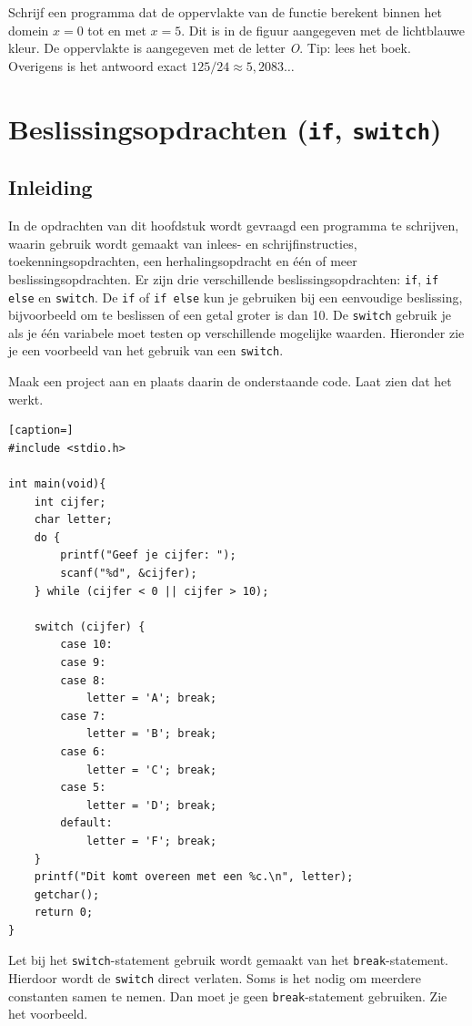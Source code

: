 \documentclass[a4paper,10pt,fleqn,twoside]{article}
\begin{document}
Schrijf een programma dat de oppervlakte van de functie berekent binnen het domein $x=0$ tot en met $x=5$. Dit is in de figuur aangegeven met de lichtblauwe kleur. De oppervlakte is aangegeven met de letter \textsl{O}. Tip: lees het boek. Overigens is het antwoord exact $125/24 \approx 5,2083\ldots$


\clearpage
\section{Beslissingsopdrachten (\texttt{if}, \texttt{switch})}

\subsection{Inleiding}
In de opdrachten van dit hoofdstuk wordt gevraagd een programma te schrijven, waarin gebruik wordt gemaakt van inlees- en schrijfinstructies, toekenningsopdrachten, een herhalingsopdracht en één of meer beslissingsopdrachten. Er zijn drie verschillende beslissingsopdrachten: \lstinline|if|, \lstinline|if else| en \lstinline|switch|. De \lstinline|if| of \lstinline|if else| kun je gebruiken bij een eenvoudige beslissing, bijvoorbeeld om te beslissen of een getal groter is dan 10. De \lstinline|switch| gebruik je als je één variabele moet testen op verschillende mogelijke waarden. Hieronder zie je een voorbeeld van het gebruik van een \lstinline|switch|.

Maak een project aan en plaats daarin de onderstaande code. Laat zien dat het werkt.

\begin{lstlisting}[caption=]
#include <stdio.h>

int main(void){
    int cijfer;
    char letter;
    do {
        printf("Geef je cijfer: ");
        scanf("%d", &cijfer);
    } while (cijfer < 0 || cijfer > 10);
    
    switch (cijfer) {
        case 10:
        case 9:
        case 8:
            letter = 'A'; break;
        case 7: 
            letter = 'B'; break;
        case 6: 
            letter = 'C'; break;
        case 5:
            letter = 'D'; break;
        default:
            letter = 'F'; break;
    }
    printf("Dit komt overeen met een %c.\n", letter);
    getchar();
    return 0;
}
\end{lstlisting}

Let bij het \lstinline|switch|-statement gebruik wordt gemaakt van het \lstinline|break|-statement. Hierdoor wordt de \lstinline|switch| direct verlaten. Soms is het nodig om meerdere constanten samen te nemen. Dan moet je geen \lstinline|break|-statement gebruiken. Zie het voorbeeld.
\end{document}
